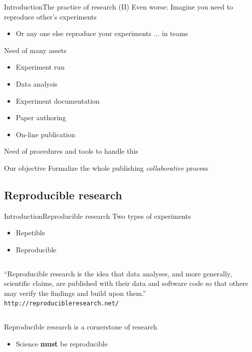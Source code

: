 \documentclass{beamer}
\begin{document}

\begin{frame}{Introduction}{The practice of research (II)}
	Even worse: Imagine you need to reproduce other's experiments
    \begin{itemize}
		\item Or any one else reproduce your experiments ... \alert{in teams}
    \end{itemize}
	
	Need of many assets
    \begin{itemize}
		\item Experiment run
		\item Data analysis
		\item Experiment documentation
		\item Paper authoring
		\item \alert{On-line publication}
    \end{itemize}

	Need of procedures and tools to handle this
	\begin{block}{Our objective}
	Formalize the whole publishing \textit{collaborative} process
	\end{block}
\end{frame}

\subsection{Reproducible research}

\begin{frame}{Introduction}{Reproducible research}
	Two types of experiments
	\begin{itemize}
	\item Repetible 
	\item Reproducible
	\end{itemize}

	\vspace{-0.3cm}
	\begin{center}
	\begin{columns}
	\begin{block}{}
	\begin{center}
	``Reproducible research is the idea that data analyses, and more generally, scientific claims, are published with their data and software code so that others may verify the findings and build upon them.''\\ 
	\texttt{http://reproducibleresearch.net/}
	\end{center}
	\end{block}
	\end{columns}
	\end{center}
	
	Reproducible research is a cornerstone of research
    \begin{itemize}
	\item Science \textbf{must} be reproducible
    \end{itemize}
\end{frame}
\end{document}
